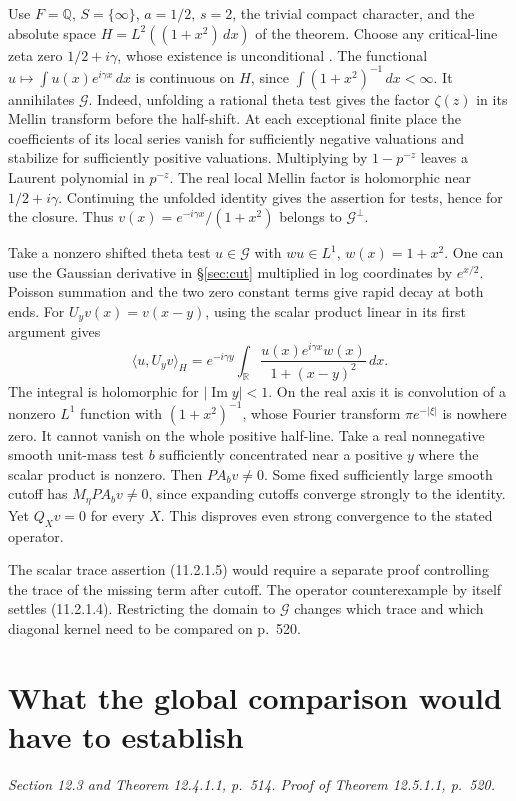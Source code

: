 \documentclass[11pt,letterpaper]{article}
\newcommand{\R}{\mathbb R}
\newcommand{\Q}{\mathbb Q}
\newcommand{\G}{\mathcal G}
\newcommand{\Ima}{\operatorname{Im}}
\newcommand{\dd}{\,d}
\newcommand{\step}[1]{\par\smallskip{\color{ink}\bfseries #1}\enspace}
\newcommand{\source}[1]{{\small\itshape #1}\par}
\newcommand{\pagepart}[2]{\clearpage\section{#1}\label{#2}}
\begin{document}
\step{An actual vector distinguishes the two limits.}
Use \(F=\Q\), \(S=\{\infty\}\), \(a=1/2\), \(s=2\), the trivial compact character, and the absolute space \(H=L^2((1+x^2)\,dx)\) of the theorem. Choose any critical-line zeta zero \(1/2+i\gamma\), whose existence is unconditional \cite{conrey}. The functional \(u\mapsto\int u(x)e^{i\gamma x}\,dx\) is continuous on \(H\), since \(\int (1+x^2)^{-1}\,dx<\infty\). It annihilates \(\G\). Indeed, unfolding a rational theta test gives the factor \(\zeta(z)\) in its Mellin transform before the half-shift. At each exceptional finite place the coefficients of its local series vanish for sufficiently negative valuations and stabilize for sufficiently positive valuations. Multiplying by \(1-p^{-z}\) leaves a Laurent polynomial in \(p^{-z}\). The real local Mellin factor is holomorphic near \(1/2+i\gamma\). Continuing the unfolded identity gives the assertion for tests, hence for the closure. Thus \(v(x)=e^{-i\gamma x}/(1+x^2)\) belongs to \(\G^\perp\).

Take a nonzero shifted theta test \(u\in\G\) with \(wu\in L^1\), \(w(x)=1+x^2\). One can use the Gaussian derivative in \S\ref{sec:cut} multiplied in log coordinates by \(e^{x/2}\). Poisson summation and the two zero constant terms give rapid decay at both ends. For \(U_yv(x)=v(x-y)\), using the scalar product linear in its first argument gives
\[
 \langle u,U_yv\rangle_H=e^{-i\gamma y}
    \int_\R\frac{u(x)e^{i\gamma x}w(x)}{1+(x-y)^2}\dd x .
\]
The integral is holomorphic for \(|\Ima y|<1\). On the real axis it is convolution of a nonzero \(L^1\) function with \((1+x^2)^{-1}\), whose Fourier transform \(\pi e^{-|\xi|}\) is nowhere zero. It cannot vanish on the whole positive half-line. Take a real nonnegative smooth unit-mass test \(b\) sufficiently concentrated near a positive \(y\) where the scalar product is nonzero. Then \(PA_bv\ne0\). Some fixed sufficiently large smooth cutoff has \(M_\eta PA_bv\ne0\), since expanding cutoffs converge strongly to the identity. Yet \(Q_Xv=0\) for every \(X\). This disproves even strong convergence to the stated operator.

The scalar trace assertion (11.2.1.5) would require a separate proof controlling the trace of the missing term after cutoff. The operator counterexample by itself settles (11.2.1.4). Restricting the domain to \(\G\) changes which trace and which diagonal kernel need to be compared on p.~520.

\pagepart{What the global comparison would have to establish}{sec:missing}
\source{Section 12.3 and Theorem 12.4.1.1, p.~514. Proof of Theorem 12.5.1.1, p.~520.}
\end{document}
